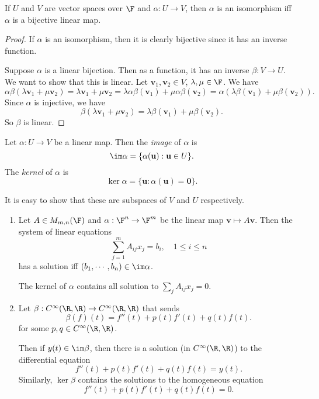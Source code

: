 \documentclass[a4paper]{article}
\begin{document}
\begin{lemma}
  If $U$ and $V$ are vector spaces over $\F$ and $\alpha: U\to V$, then $\alpha$ is an isomorphism iff $\alpha$ is a bijective linear map.
\end{lemma}

\begin{proof}
  If $\alpha$ is an isomorphism, then it is clearly bijective since it has an inverse function.

  Suppose $\alpha$ is a linear bijection. Then as a function, it has an inverse $\beta: V\to U$. We want to show that this is linear. Let $\mathbf{v}_1, \mathbf{v}_2 \in V$, $\lambda, \mu \in \F$. We have
  \[
    \alpha \beta(\lambda \mathbf{v}_1 + \mu \mathbf{v}_2) = \lambda \mathbf{v}_1 + \mu \mathbf{v}_2 = \lambda \alpha \beta (\mathbf{v}_1) + \mu \alpha \beta (\mathbf{v}_2) = \alpha (\lambda \beta(\mathbf{v}_1) + \mu \beta (\mathbf{v}_2)).
  \]
  Since $\alpha$ is injective, we have
  \[
    \beta(\lambda \mathbf{v}_1 + \mu \mathbf{v}_2) = \lambda \beta (\mathbf{v}_1) + \mu \beta (\mathbf{v}_2).
  \]
  So $\beta$ is linear.
\end{proof}

\begin{defi}
  Let $\alpha: U\to V$ be a linear map. Then the \emph{image} of $\alpha$ is
  \[
    \im \alpha = \{\alpha (\mathbf{u}): \mathbf{u}\in U\}.
  \]
  The \emph{kernel} of $\alpha$ is
  \[
    \ker \alpha = \{\mathbf{u}: \alpha (\mathbf{u}) = \mathbf{0}\}.
  \]
\end{defi}
It is easy to show that these are subspaces of $V$ and $U$ respectively.

\begin{eg}\leavevmode
  \begin{enumerate}
    \item Let $A\in M_{m, n}(\F)$ and $\alpha: \F^n \to \F^m$ be the linear map $\mathbf{v}\mapsto A\mathbf{v}$. Then the system of linear equations
      \[
        \sum_{j = 1}^m A_{ij}x_j = b_i,\quad 1 \leq i \leq n
      \]
      has a solution iff $(b_1, \cdots, b_n) \in \im \alpha$.

      The kernel of $\alpha$ contains all solution to $\sum_j A_{ij}x_j = 0$.
    \item Let $\beta: C^{\infty}(\R, \R) \to C^{\infty}(\R, \R)$ that sends
      \[
        \beta(f)(t) = f''(t) + p(t) f'(t) + q(t) f(t).
      \]
      for some $p, q\in C^{\infty}(\R, \R)$.

      Then if $y(t) \in \im \beta$, then there is a solution (in $C^\infty (\R, \R)$) to the differential equation
      \[
        f''(t) + p(t) f'(t) + q(t) f(t) = y(t).
      \]
      Similarly, $\ker \beta$ contains the solutions to the homogeneous equation
      \[
        f''(t) + p(t) f'(t) + q(t) f(t) = 0.
      \]
  \end{enumerate}
\end{eg}
\end{document}
